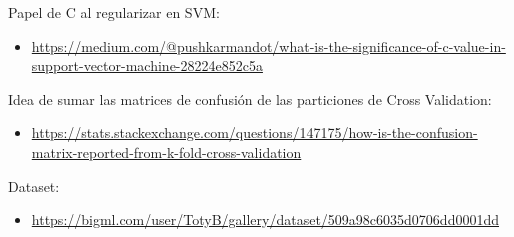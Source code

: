 \documentclass{article}
\begin{document}
Papel de C al regularizar en SVM:
\begin{itemize}
\item \href{https://medium.com/@pushkarmandot/what-is-the-significance-of-c-value-in-support-vector-machine-28224e852c5a}{https://medium.com/@pushkarmandot/what-is-the-significance-of-c-value-in-support-vector-machine-28224e852c5a}
\end{itemize}

Idea de sumar las matrices de confusión de las particiones de Cross Validation:
\begin{itemize}
\item \href{https://stats.stackexchange.com/questions/147175/how-is-the-confusion-matrix-reported-from-k-fold-cross-validation}{https://stats.stackexchange.com/questions/147175/how-is-the-confusion-matrix-reported-from-k-fold-cross-validation}
\end{itemize}

Dataset:
\begin{itemize}
\item \href{https://bigml.com/user/TotyB/gallery/dataset/509a98c6035d0706dd0001dd}{https://bigml.com/user/TotyB/gallery/dataset/509a98c6035d0706dd0001dd}
\end{itemize}
\end{document}
